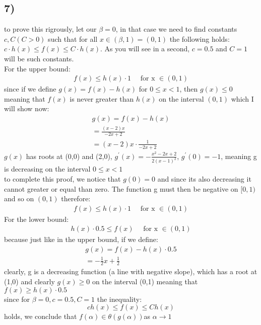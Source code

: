 \documentclass{report}
\begin{document}
\subsection*{7)}
to prove this rigrously, let our $\beta = 0$, in that case we need to find constants $c,C (C > 0)$ such that for all $x \in (\beta,1)=(0,1)$ the following holds: $c\cdot h(x) \leq f(x) \leq C\cdot h(x)$. As you will see in a second, $c = 0.5$ and $C = 1$ will be such constants.\medskip\\
For the upper bound:\\
\begin{gather*}
    f(x) \leq h(x)\cdot 1 \quad \text{ for x } \in (0,1)
\end{gather*}
since if we define $g(x) = f(x) - h(x)$ for $0 \leq x < 1$, then $g(x) \leq 0$ meaning that $f(x)$ is never greater than $h(x)$ on the interval $(0,1)$ which I will show now:\\
\begin{gather*}
    g(x) = f(x) - h(x)\\ 
    = \frac{(x-2)x}{-2x+2}\\
    = (x-2)x \cdot \frac{1}{-2x+2}
\end{gather*}
$g(x)$ has roots at (0,0) and (2,0), $g^{'}(x) = -\frac{x^2 -2x + 2}{2(x-1)^{2}}$, $g^{'}(0) = -1$, meaning g is decreasing on the interval $0 \leq x < 1$\\
to complete this proof, we notice that $g(0) = 0$ and since its also decreasing it cannot greater or equal than zero. The function g must then be negative on $[0,1)$ and so on $(0,1)$ therefore:
\begin{gather*}
    f(x) \leq h(x)\cdot 1 \quad \text{ for x } \in (0,1)
\end{gather*}
For the lower bound:\\
\begin{gather*}
    h(x)\cdot 0.5\leq f(x)  \quad \text{ for x } \in (0,1)
\end{gather*}
because just like in the upper bound, if we define:
\begin{gather*}
    g(x) = f(x) - h(x)\cdot 0.5\\ 
    = -\frac{1}{2}x + \frac{1}{2}
\end{gather*}
clearly, g is a decreasing function (a line with negative slope), which has a root at (1,0) and clearly $g(x) \geq 0$ on the interval (0,1)
meaning that $f(x) \geq h(x)\cdot 0.5$ \\

since for $\beta = 0, c = 0.5, C = 1$ the inequality:
\begin{equation*}
    ch(x) \leq f(x) \leq Ch(x)
\end{equation*}
holds, we conclude that $f(\alpha) \in \theta(g(\alpha))$as $\alpha \rightarrow 1$ 
\end{document}
